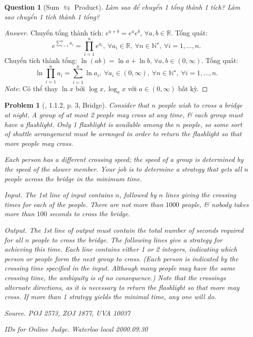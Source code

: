 \documentclass{article}
\newtheorem{problem}{Problem}
\newtheorem{question}{Question}
\begin{document}
\begin{question}[Sum $\leftrightarrows$ Product]
	Làm sao để chuyển 1 tổng thành 1 tích? Làm sao chuyển 1 tích thành 1 tổng?
\end{question}

\begin{proof}[Answer]
	Chuyển tổng thành tích: $e^{a + b} = e^ae^b$, $\forall a,b\in\mathbb{R}$. Tổng quát:
	\begin{equation*}
		e^{\sum_{i=1}^n a_i} = \prod_{i=1}^n e^{a_i},\ \forall a_i\in\mathbb{R},\ \forall n\in\mathbb{N}^\star,\ \forall i = 1,\ldots,n.
	\end{equation*}
	Chuyển tích thành tổng: $\ln(ab) = \ln a + \ln b$, $\forall a,b\in(0,\infty)$. Tổng quát:
	\begin{equation*}
		\ln\prod_{i=1}^n a_i = \sum_{i=1}^n \ln a_i,\ \forall a_i\in(0,\infty),\ \forall n\in\mathbb{N}^\star,\ \forall i = 1,\ldots,n.
	\end{equation*}
	{\it Note}: Có thể thay $\ln x$ bởi $\log x,\log_a x$ với $a\in(0,\infty)$ bất kỳ.
\end{proof}

\begin{problem}[\cite{Wu_Wang2018}, 1.1.2, p. 3, Bridge]
	Consider that $n$ people wish to cross a bridge at night. A group of at most 2 people may cross at any time, \& each group must have a flashlight. Only 1 flashlight is available among the $n$ people, so some sort of shuttle arrangement must be arranged in order to return the flashlight so that more people may cross. 
	
	Each person has a different crossing speed; the speed of a group is determined by the speed of the slower member. Your job is to determine a strategy that gets all $n$ people across the bridge in the minimum time.
	\item {\sf Input.} The 1st line of input contains $n$, followed by $n$ lines giving the crossing times for each of the people. There are not more than $1000$ people, \& nobody takes more than $100$ seconds to cross the bridge.
	\item {\sf Output.} The 1st line of output must contain the total number of seconds required for all $n$ people to cross the bridge. The following lines give a strategy for achieving this time. Each line contains either 1 or 2 integers, indicating which person or people form the next group to cross. (Each person is indicated by the crossing time specified in the input. Although many people may have the same crossing time, the ambiguity is of no consequence.) Note that the crossings alternate directions, as it is necessary to return the flashlight so that more may cross. If more than 1 strategy yields the minimal time, any one will do.
	\item {\sf Source.} POJ 2573, ZOJ 1877, UVA 10037
	\item {\sf IDs for Online Judge.} Waterloo local 2000.09.30
\end{problem}
\end{document}
